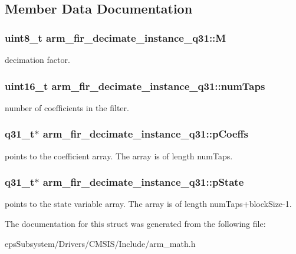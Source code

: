 \subsection{Member Data Documentation}
\hypertarget{structarm__fir__decimate__instance__q31_ad3d6936c36303b30dd38f1eddf248ae5}{
\subsubsection[{M}]{\setlength{\rightskip}{0pt plus 5cm}uint8\-\_\-t arm\-\_\-fir\-\_\-decimate\-\_\-instance\-\_\-q31\-::\-M}}\label{structarm__fir__decimate__instance__q31_ad3d6936c36303b30dd38f1eddf248ae5}
decimation factor. \hypertarget{structarm__fir__decimate__instance__q31_a37915d42b0dc5e3057ebe83110798482}{
\subsubsection[{num\-Taps}]{\setlength{\rightskip}{0pt plus 5cm}uint16\-\_\-t arm\-\_\-fir\-\_\-decimate\-\_\-instance\-\_\-q31\-::num\-Taps}}\label{structarm__fir__decimate__instance__q31_a37915d42b0dc5e3057ebe83110798482}
number of coefficients in the filter. \hypertarget{structarm__fir__decimate__instance__q31_a030d0391538c2481c5b348fd09a952ff}{
\subsubsection[{p\-Coeffs}]{\setlength{\rightskip}{0pt plus 5cm}q31\-\_\-t$\ast$ arm\-\_\-fir\-\_\-decimate\-\_\-instance\-\_\-q31\-::p\-Coeffs}}\label{structarm__fir__decimate__instance__q31_a030d0391538c2481c5b348fd09a952ff}
points to the coefficient array. The array is of length num\-Taps. \hypertarget{structarm__fir__decimate__instance__q31_a0ef0ef9e265f7ab873cfc6daa7593fdb}{
\subsubsection[{p\-State}]{\setlength{\rightskip}{0pt plus 5cm}q31\-\_\-t$\ast$ arm\-\_\-fir\-\_\-decimate\-\_\-instance\-\_\-q31\-::p\-State}}\label{structarm__fir__decimate__instance__q31_a0ef0ef9e265f7ab873cfc6daa7593fdb}
points to the state variable array. The array is of length num\-Taps+block\-Size-\/1. 

The documentation for this struct was generated from the following file\-:\begin{DoxyCompactItemize}
\item 
eps\-Subsystem/\-Drivers/\-C\-M\-S\-I\-S/\-Include/arm\-\_\-math.\-h\end{DoxyCompactItemize}
